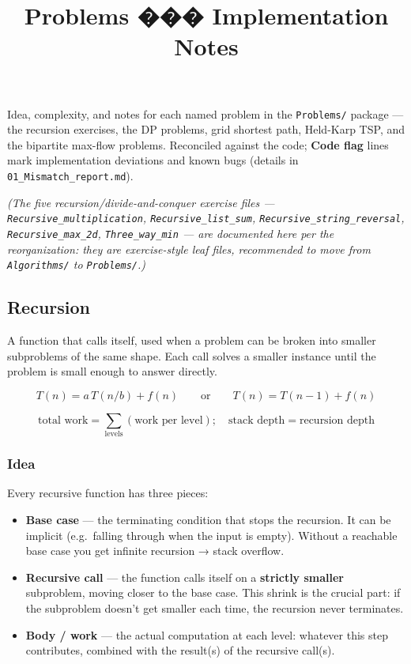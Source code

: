 \documentclass[
  10pt,
  letterpaper,
  onecolumn]{article}
\title{Problems ��� Implementation Notes}
\author{}
\date{}
\providecommand{\tightlist}{%
  \setlength{\itemsep}{0pt}\setlength{\parskip}{0pt}}
\begin{document}
\maketitle

{
\hypersetup{linkcolor=black}
\setcounter{tocdepth}{2}
\tableofcontents
}
Idea, complexity, and notes for each named problem in the
\texttt{Problems/} package --- the recursion exercises, the DP problems,
grid shortest path, Held-Karp TSP, and the bipartite max-flow problems.
Reconciled against the code; \textbf{Code flag} lines mark
implementation deviations and known bugs (details in
\texttt{01\_Mismatch\_report.md}).

\emph{(The five recursion/divide-and-conquer exercise files ---
\texttt{Recursive\_multiplication}, \texttt{Recursive\_list\_sum},
\texttt{Recursive\_string\_reversal}, \texttt{Recursive\_max\_2d},
\texttt{Three\_way\_min} --- are documented here per the reorganization:
they are exercise-style leaf files, recommended to move from
\texttt{Algorithms/} to \texttt{Problems/}.)}

\hypertarget{recursion}{%
\subsection{Recursion}\label{recursion}}

A function that calls itself, used when a problem can be broken into
smaller subproblems of the same shape. Each call solves a smaller
instance until the problem is small enough to answer directly.

\begin{equation*}
T(n)=a\,T(n/b)+f(n)
\qquad\text{or}\qquad
T(n)=T(n-1)+f(n)
\end{equation*}

\begin{equation*}
\text{total work}=\sum_{\text{levels}}(\text{work per level});\quad
\text{stack depth}=\text{recursion depth}
\end{equation*}

\hypertarget{idea}{%
\subsubsection{Idea}\label{idea}}

Every recursive function has three pieces:

\begin{itemize}
\tightlist
\item
  \textbf{Base case} --- the terminating condition that stops the
  recursion. It can be implicit (e.g.~falling through when the input is
  empty). Without a reachable base case you get infinite recursion →
  stack overflow.
\item
  \textbf{Recursive call} --- the function calls itself on a
  \textbf{strictly smaller} subproblem, moving closer to the base case.
  This shrink is the crucial part: if the subproblem doesn't get smaller
  each time, the recursion never terminates.
\item
  \textbf{Body / work} --- the actual computation at each level:
  whatever this step contributes, combined with the result(s) of the
  recursive call(s).
\end{itemize}
\end{document}
